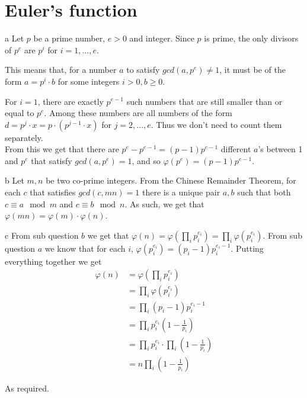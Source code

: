 \documentclass{article}
\begin{document}
\section{Euler's function}
\begin{paragraph}
    a Let \(p\) be a prime number, \(e > 0\) and integer. Since \(p\) is prime, the only divisors of \(p^e\) are \(p^i\) for \(i = 1, ..., e\).
    
    This means that, for a number \(a\) to satisfy \(gcd(a, p^e) \neq 1\), it must be of the form \(a = p^i \cdot b\) for some integers \(i > 0, b \geq 0\).
    
    For \(i = 1\), there are exactly \(p^{e - 1}\) such numbers that are still smaller than or equal to \(p^e\). Among these numbers are all numbers of the form \(d = p^j \cdot x = p \cdot (p^{j - 1} \cdot x)\) for \(j = 2, ..., e\). Thus we don't need to count them separately.\\
    
    From this we get that there are \(p^e - p^{e - 1} = (p - 1) p^{e - 1}\) different \(a\)'s between 1 and \(p^e\) that satisfy \(gcd(a, p^e) = 1\), and so \(\varphi(p^e) = (p - 1) p^{e - 1}\).
\end{paragraph}

\begin{paragraph}
    b Let \(m, n\) be two co-prime integers. From the Chinese Remainder Theorem, for each \(c\) that satisfies \(gcd(c, mn) = 1\) there is a unique pair \(a, b\) such that both \(c \equiv a \mod{m}\) and \(c \equiv b \mod{n}\). As such, we get that \(\varphi(mn) = \varphi(m) \cdot \varphi(n)\). \iffalse Can you go over this? \fi
\end{paragraph}

\begin{paragraph}
    c From sub question \(b\) we get that \(\varphi(n) = \varphi(\prod\limits_i p_i^{e_i}) = \prod\limits_i \varphi(p_i^{e_i})\). From sub question \(a\) we know that for each \(i\), \(\varphi(p_i^{e_i}) = (p_i - 1) p_i^{e_i - 1}\). Putting everything together we get
    \begin{align*}
        \varphi(n) &= \varphi(\prod\limits_i p_i^{e_i})\\
        &= \prod\limits_i \varphi(p_i^{e_i})\\
        &= \prod\limits_i (p_i - 1) p_i^{e_i - 1}\\
        &= \prod\limits_i p_i^{e_i} (1 - \frac{1}{p_i})\\
        &= \prod\limits_i p_i^{e_i} \cdot \prod\limits_i (1 - \frac{1}{p_i})\\
        &= n \prod\limits_i (1 - \frac{1}{p_i})
    \end{align*}
    
    As required.
\end{paragraph}
\newpage
\end{document}
